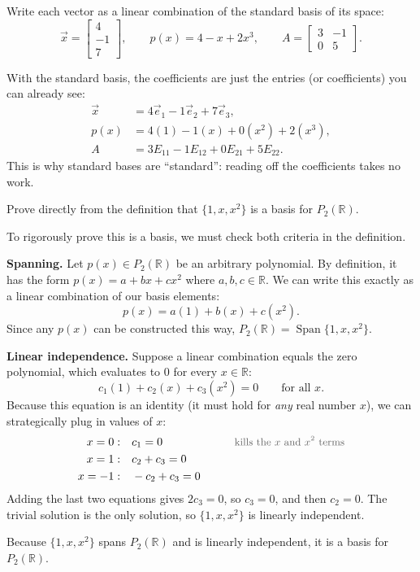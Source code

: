 \begin{example}
Write each vector as a linear combination of the standard basis of its space:
\[
\vec{x} = \begin{bmatrix} 4 \\ -1 \\ 7 \end{bmatrix},
\qquad
p(x) = 4 - x + 2x^3,
\qquad
A = \begin{bmatrix} 3 & -1 \\ 0 & 5 \end{bmatrix}.
\]

\begin{solution}
With the standard basis, the coefficients are just the entries (or coefficients) you can already see:
\begin{align*}
\vec{x} &= 4\vec{e}_1 - 1\vec{e}_2 + 7\vec{e}_3, \\
p(x)    &= 4(1) - 1(x) + 0(x^2) + 2(x^3), \\
A       &= 3E_{11} - 1E_{12} + 0E_{21} + 5E_{22}.
\end{align*}
This is why standard bases are ``standard'': reading off the coefficients takes no work.
\end{solution}
\end{example}

\begin{example}
Prove directly from the definition that $\{1, x, x^2\}$ is a basis for $P_2(\mathbb{R})$.

\begin{solution}
To rigorously prove this is a basis, we must check both criteria in the definition.

\textbf{Spanning.} Let $p(x) \in P_2(\mathbb{R})$ be an arbitrary polynomial. By definition, it has the form $p(x) = a + bx + cx^2$ where $a, b, c \in \mathbb{R}$. We can write this exactly as a linear combination of our basis elements:
\[
p(x) = a(1) + b(x) + c(x^2).
\]
Since any $p(x)$ can be constructed this way, $P_2(\mathbb{R}) = \operatorname{Span}\{1, x, x^2\}$.

\textbf{Linear independence.} Suppose a linear combination equals the zero polynomial, which evaluates to $0$ for every $x \in \mathbb{R}$:
\[
c_1(1) + c_2(x) + c_3(x^2) = 0 \qquad \text{for all } x.
\]
Because this equation is an identity (it must hold for \emph{any} real number $x$), we can strategically plug in values of $x$:
\begin{alignat*}{2}
x = 0: &\quad c_1 = 0 &\qquad& \by{kills the $x$ and $x^2$ terms} \\
x = 1: &\quad c_2 + c_3 = 0 && \\
x = -1: &\quad -c_2 + c_3 = 0 &&
\end{alignat*}
Adding the last two equations gives $2c_3 = 0$, so $c_3 = 0$, and then $c_2 = 0$. The trivial solution is the only solution, so $\{1, x, x^2\}$ is linearly independent.

Because $\{1, x, x^2\}$ spans $P_2(\mathbb{R})$ and is linearly independent, it is a basis for $P_2(\mathbb{R})$.
\end{solution}
\end{example}

